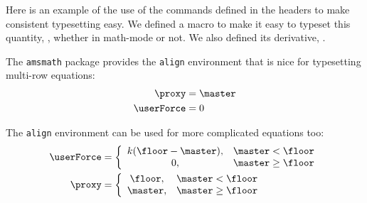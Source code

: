 Here is an example of the use of the commands defined in the headers to make consistent typesetting easy.
We defined a macro to make it easy to typeset this quantity, \proxy, whether in math-mode or not.
We also defined its derivative, \proxyVel.

The \texttt{amsmath} package provides the \texttt{align} environment that is nice for typesetting multi-row equations:
\begin{align}
\proxy &= \master \\
\userForce &= 0
\end{align}

The \texttt{align} environment can be used for more complicated equations too:
\begin{align}
\userForce &= \left\{\begin{array}{cl}
  k(\floor - \master), & \master < \floor\\
  0, & \master \geq \floor
  \end{array}\right. \\
\proxy &= \left\{\begin{array}{cl}
  \floor, & \master < \floor\\
  \master, & \master \geq \floor
  \end{array}\right.
\end{align}

